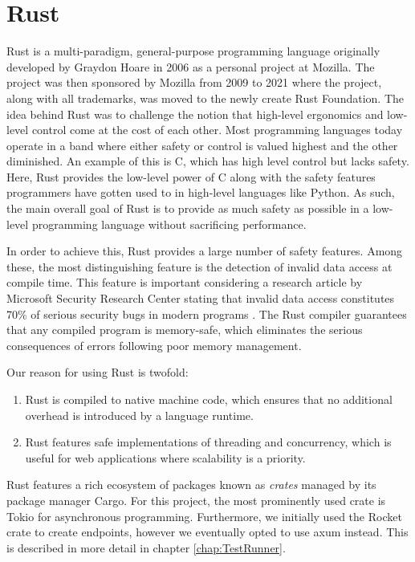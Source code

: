\section*{Rust}
Rust is a multi-paradigm, general-purpose programming language originally developed by Graydon Hoare in 2006 as a personal project at Mozilla.
The project was then sponsored by Mozilla from 2009 to 2021 where the project, along with all trademarks, was moved to the newly create Rust Foundation.
The idea behind Rust was to challenge the notion that high-level ergonomics and low-level control come at the cost of each other\cite{Rust_Book}.
Most programming languages today operate in a band where either safety or control is valued highest and the other diminished. An example of this is C, which has high level control but lacks safety.
Here, Rust provides the low-level power of C along with the safety features programmers have gotten used to in high-level languages like Python.
As such, the main overall goal of Rust is to provide as much safety as possible in a low-level programming language without sacrificing performance. \cite{Rust_in_Action}

In order to achieve this, Rust provides a large number of safety features.
Among these, the most distinguishing feature is the detection of invalid data access at compile time.
This feature is important considering a research article by Microsoft Security Research Center stating that invalid data access constitutes 70\% of serious security bugs in modern programs \cite{Safe_Systems_Languages}.
The Rust compiler guarantees that any compiled program is memory-safe, which eliminates the serious consequences of errors following poor memory management\cite{Rust_in_Action}.

Our reason for using Rust is twofold:
\begin{enumerate}
    \item Rust is compiled to native machine code, which ensures that no additional overhead is introduced by a language runtime.
    \item Rust features safe implementations of threading and concurrency, which is useful for web applications where scalability is a priority.
\end{enumerate}

Rust features a rich ecosystem of packages known as \textit{crates} managed by its package manager Cargo\cite{Cargo}.
For this project, the most prominently used crate is Tokio\cite{Tokio} for asynchronous programming.
Furthermore, we initially used the Rocket\cite{Rocket} crate to create endpoints, however we eventually opted to use axum\cite{axum} instead.
This is described in more detail in chapter \ref{chap:TestRunner}.

